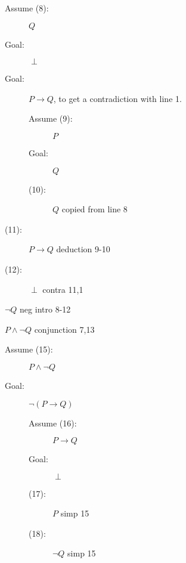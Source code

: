 \documentclass[12pt]{article}
\begin{document}
\begin{description}
\begin{description}
\begin{description}
\begin{description}

\item[Assume (8):]  $Q$

\item[Goal:]  $\perp$

\item[Goal:]  $P \rightarrow Q$, to get a contradiction with line 1.

\begin{description}

\item[Assume (9):]  $P$

\item[Goal:] $Q$

\item [(10):]  $Q$ copied from line 8

\end{description}

\item[(11):]  $P \rightarrow Q$  deduction 9-10

\item[(12):]  $\perp$  contra 11,1

\end{description}

\item[(13):]  $\neg Q$  neg intro 8-12

\item[(14):]  $P \wedge \neg Q$  conjunction 7,13

\end{description}

\item[Part II:]

\begin{description}

\item[Assume (15):]  $P \wedge \neg Q$

\item[Goal:]  $\neg (P \rightarrow Q)$

\begin{description}

\item[Assume (16):]  $P \rightarrow Q$

\item[Goal:]  $\perp$

\item[(17):]  $P$ simp 15

\item[(18):]  $\neg Q$ simp 15


\end{description}
\end{description}
\end{description}
\end{description}
\end{document}
